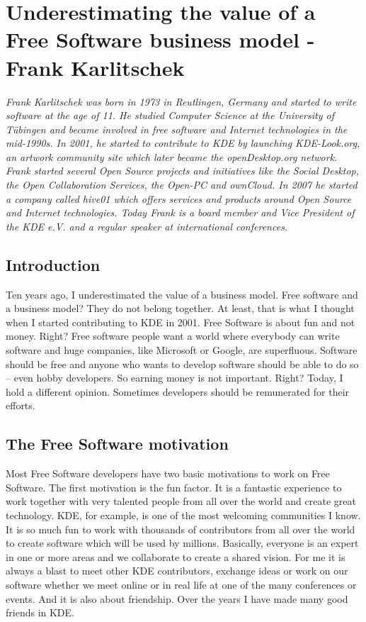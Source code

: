 \chapter{Underestimating the value of a Free Software business model - Frank Karlitschek}

\textit{Frank Karlitschek was born in 1973 in Reutlingen, Germany and started to
write software at the age of 11. He studied Computer Science at the University
of T\"ubingen and became involved in free software and Internet technologies in
the mid-1990s. In 2001, he started to contribute to KDE by launching KDE-Look.org,
an artwork community site which later became the openDesktop.org network. Frank
started several Open Source projects and initiatives like the Social Desktop,
the Open Collaboration Services, the Open-PC and ownCloud. In 2007 he started a
company called hive01 which offers services and products around Open Source and
Internet technologies.
Today Frank is a board member and Vice President of the KDE e.V. and a regular
speaker at international conferences.}

\section*{Introduction}

Ten years ago, I underestimated the value of a business model. Free software and
a business model? They do not belong together. At least, that is what I thought
when I started contributing to KDE in 2001. Free Software is about fun and not
money. Right? Free software people want a world where everybody can write
software and huge companies, like Microsoft or Google, are superfluous. Software
should be free and anyone who wants to develop software should be able to do so
-- even hobby developers. So earning money is not important. Right? Today, I
hold a different opinion. Sometimes developers should be remunerated for their
efforts.  

\section*{The Free Software motivation}

Most Free Software developers have two basic motivations to work on Free
Software. The first motivation is the fun factor. It is a fantastic experience
to work together with very talented people from all over the world and create
great technology. KDE, for example, is one of the most welcoming communities I
know. It is so much fun to work with thousands of contributors from all over the
world to create software which will be used by millions. Basically, everyone is
an expert in one or more areas and we collaborate to create a shared vision. For
me it is always a blast to meet other KDE contributors, exchange ideas or work
on our software whether we meet online or in real life at one of the many
conferences or events. And it is also about friendship. Over the years I have
made many good friends in KDE.

